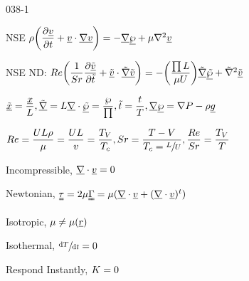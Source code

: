 \begin{mitframe}{038-1}

\begin{listone}
\item NSE $\dens\bigg(\dfrac{\partial\uline{\vvel}}{\partial{t}}+\uline{\vvel}\cdot\uline{\nabla\vvel}\bigg)=-\gradop\uline{\dynpress}+\chempot\nabla^{2}\uline{\vvel}$

\item NSE ND: $\reynolds\bigg(\dfrac{1}{\strouhal}\dfrac{\partial\uline{\tilde{\vvel}}}{\partial\tilde{t}}+\uline{\tilde{\vvel}}\cdot\uline{\tilde{\nabla}\tilde{\vvel}}\bigg)=-\bigg(\dfrac{\prod\length}{\chempot\uvel}\bigg)\tilde{\gradop}\uline{\tilde{\dynpress}}+\tilde{\nabla}^{2}\uline{\tilde{\vvel}}$



\item$\uline{\tilde{\disp}}=\dfrac{\uline{\disp}}{\length},{\tilde{\gradop}}=\length\gradop\cdot\uline{\tilde{\dynpress}}=\dfrac{\dynpress}{\prod}, \tilde{t}=\dfrac{t}{\Temp},\gradop\uline{\dynpress}=\nabla\p-\dens\uline{\grav}$

\item $\reynolds=\dfrac{\intenergy\length\dens}{\chempot}=\dfrac{\intenergy\length}{\vvel}=\dfrac{\Temp_{\vol}}{\Temp_{\lightspeed}}, \strouhal=\dfrac{\Temp-{\vol}}{\Temp_{\lightspeed}=\sfrac{\length}{\intenergy}},\dfrac{\reynolds}{\strouhal}=\dfrac{\Temp_{\vol}}{\Temp}$


				\begin{listtwo}

                \item Incompressible, $\gradop\cdot\uline\vvel=0$
                
                \item Newtonian,  $\uuline{\torque}=2\chempot\straintens =\chempot(\gradop\cdot\uline{\vvel}+(\gradop\cdot\uline{\vvel})^{t})$
                
                
                \item Isotropic, $\chempot\neq\chempot(\uline{\pos})$
                
              \item Isothermal, $\sfrac{ \mathrm{d}\Temp}{\mathrm{d}t}=0$
               
               \item Respond Instantly, $\taylordisp=0$
               
				\end{listtwo}


\end{listone}
\end{mitframe}